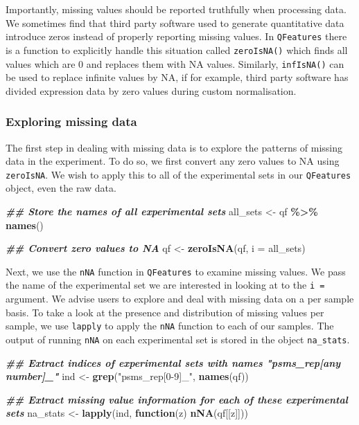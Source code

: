 \documentclass[9pt,a4paper,]{extarticle}
\newenvironment{Shaded}{\begin{snugshade}}{\end{snugshade}}
\newcommand{\AttributeTok}[1]{\textcolor[rgb]{0.13,0.29,0.53}{#1}}
\newcommand{\ControlFlowTok}[1]{\textcolor[rgb]{0.13,0.29,0.53}{\textbf{#1}}}
\newcommand{\DocumentationTok}[1]{\textcolor[rgb]{0.56,0.35,0.01}{\textbf{\textit{#1}}}}
\newcommand{\FunctionTok}[1]{\textcolor[rgb]{0.13,0.29,0.53}{\textbf{#1}}}
\newcommand{\NormalTok}[1]{#1}
\newcommand{\OtherTok}[1]{\textcolor[rgb]{0.56,0.35,0.01}{#1}}
\newcommand{\SpecialCharTok}[1]{\textcolor[rgb]{0.81,0.36,0.00}{\textbf{#1}}}
\newcommand{\StringTok}[1]{\textcolor[rgb]{0.31,0.60,0.02}{#1}}
\begin{document}
Importantly, missing values should be reported truthfully when processing data.
We sometimes find that third party software used to generate quantitative data
introduce zeros instead of properly reporting missing values. In \texttt{QFeatures} there
is a function to explicitly handle this situation called \texttt{zeroIsNA()}
which finds all values which are 0 and replaces them with NA values. Similarly,
\texttt{infIsNA()} can be used to replace infinite values by NA, if for example,
third party software has divided expression data by zero values during custom
normalisation.

\subsubsection{Exploring missing data}\label{exploring-missing-data}

The first step in dealing with missing data is to explore the patterns of
missing data in the experiment. To do so, we first convert any zero values to NA
using \texttt{zeroIsNA}. We wish to apply this to all of the experimental sets in our
\texttt{QFeatures} object, even the raw data.

\begin{Shaded}
\begin{Highlighting}[]
\DocumentationTok{\#\# Store the names of all experimental sets}
\NormalTok{all\_sets }\OtherTok{\textless{}{-}}\NormalTok{ qf }\SpecialCharTok{\%\textgreater{}\%}
  \FunctionTok{names}\NormalTok{() }

\DocumentationTok{\#\# Convert zero values to NA}
\NormalTok{qf }\OtherTok{\textless{}{-}} \FunctionTok{zeroIsNA}\NormalTok{(qf, }
                \AttributeTok{i =}\NormalTok{ all\_sets)}
\end{Highlighting}
\end{Shaded}

Next, we use the \texttt{nNA} function in \texttt{QFeatures} to examine missing values. We
pass the name of the experimental set we are interested in looking at to the
\texttt{i\ =} argument. We advise users to explore and deal with missing data on a
per sample basis. To take a look at the presence and distribution of missing
values per sample, we use \texttt{lapply} to apply the \texttt{nNA} function to each of our
samples. The output of running \texttt{nNA} on each experimental set is stored in the
object \texttt{na\_stats}.

\begin{Shaded}
\begin{Highlighting}[]
\DocumentationTok{\#\# Extract indices of experimental sets with names "psms\_rep[any number]\_"}
\NormalTok{ind }\OtherTok{\textless{}{-}} \FunctionTok{grep}\NormalTok{(}\StringTok{"psms\_rep[0{-}9]\_"}\NormalTok{, }\FunctionTok{names}\NormalTok{(qf))}

\DocumentationTok{\#\# Extract missing value information for each of these experimental sets}
\NormalTok{na\_stats }\OtherTok{\textless{}{-}} \FunctionTok{lapply}\NormalTok{(ind, }\ControlFlowTok{function}\NormalTok{(z) }\FunctionTok{nNA}\NormalTok{(qf[[z]]))}
\end{Highlighting}
\end{Shaded}
\end{document}
